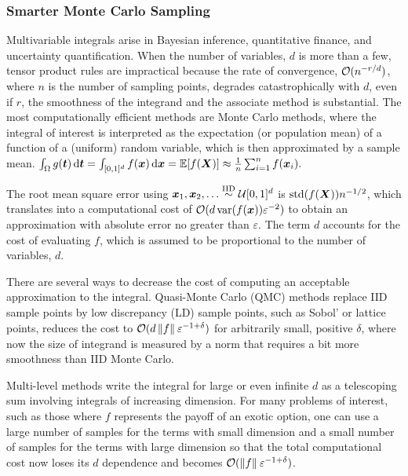 \subsubsection{Smarter Monte Carlo Sampling}
Multivariable integrals arise in Bayesian inference, quantitative finance, and uncertainty quantification.  When the number of variables, $d$ is more than a few, tensor product rules are impractical because the rate of convergence, $\mathcal{O}(n^{-r/d})$, where $n$ is the number of sampling points, degrades catastrophically with $d$, even if $r$, the smoothness of the integrand and the associate method is substantial.  The most computationally efficient methods are Monte Carlo methods, where the integral of interest is interpreted as the expectation (or population mean) of a function of a (uniform) random variable, which is then approximated by a sample mean.
$
    \int_{\Omega} g({\boldsymbol{t}}) \, \textup{d} {\boldsymbol{t}} = \int_{[0,1]^d} f({\boldsymbol{x}}) \, \textup{d} {\boldsymbol{x}} = \mathbb{E}[f({\boldsymbol{X}})] \approx \frac 1n \sum_{i=1}^n f({\boldsymbol{x}}_i).
$

The root mean square error using ${\boldsymbol{x}}_1, {\boldsymbol{x}}_2, \ldots \overset{\text{IID}}{\sim} {\mathcal{U}}[0,1]^d$ is $\operatorname{std}(f({\boldsymbol{X}})) n^{-1/2}$, which translates into a computational cost of $\mathcal{O}(d\operatorname{var}(f({\boldsymbol{x}}))\varepsilon^{-2})$ to obtain an approximation with absolute error no greater than $\varepsilon$. The term $d$ accounts for the cost of evaluating $f$, which is assumed to be proportional to the number of variables, $d$.

There are several ways to decrease the cost of computing an acceptable approximation to the integral.  Quasi-Monte Carlo (QMC) methods \cite{DicEtal14a} replace IID sample points by low discrepancy (LD) sample points, such as Sobol' or lattice points, reduces the cost to $\mathcal{O}(d\left \lVert f \right \rVert_{{}}\varepsilon^{-1+\delta})$ for arbitrarily small, positive $\delta$, where now the size of integrand is measured by a norm that requires a bit more smoothness than IID Monte Carlo. 

Multi-level methods write the integral for large or even infinite $d$ as a telescoping sum involving integrals of increasing dimension. 
For many problems of interest, such as those where $f$ represents the payoff of an exotic option, one can use a large number of samples for the terms with small dimension and a small number of samples for the terms with large dimension so that the total computational cost now loses its $d$ dependence and becomes $\mathcal{O}(\left \lVert f \right \rVert_{{}}\varepsilon^{-1+\delta})$.
 
